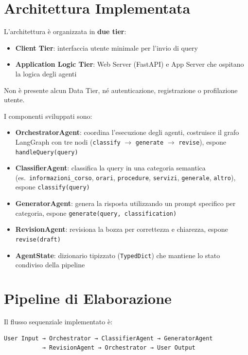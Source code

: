 \documentclass[a4paper,12pt]{report}
\begin{document}
\section{Architettura Implementata}

L'architettura è organizzata in \textbf{due tier}:
\begin{itemize}
    \item \textbf{Client Tier}: interfaccia utente minimale per l'invio di query
    \item \textbf{Application Logic Tier}: Web Server (FastAPI) e App Server che ospitano la logica degli agenti
\end{itemize}

Non è presente alcun Data Tier, né autenticazione, registrazione o profilazione utente.

I componenti sviluppati sono:
\begin{itemize}
    \item \textbf{OrchestratorAgent}: coordina l'esecuzione degli agenti, costruisce il grafo LangGraph con tre nodi (\texttt{classify} $\rightarrow$ \texttt{generate} $\rightarrow$ \texttt{revise}), espone \texttt{handleQuery(query)}
    \item \textbf{ClassifierAgent}: classifica la query in una categoria semantica (es.\ \texttt{informazioni\_corso}, \texttt{orari}, \texttt{procedure}, \texttt{servizi}, \texttt{generale}, \texttt{altro}), espone \texttt{classify(query)}
    \item \textbf{GeneratorAgent}: genera la risposta utilizzando un prompt specifico per categoria, espone \texttt{generate(query, classification)}
    \item \textbf{RevisionAgent}: revisiona la bozza per correttezza e chiarezza, espone \texttt{revise(draft)}
    \item \textbf{AgentState}: dizionario tipizzato (\texttt{TypedDict}) che mantiene lo stato condiviso della pipeline
\end{itemize}

\section{Pipeline di Elaborazione}

Il flusso sequenziale implementato è:

\begin{verbatim}
User Input → Orchestrator → ClassifierAgent → GeneratorAgent 
           → RevisionAgent → Orchestrator → User Output
\end{verbatim}
\end{document}
